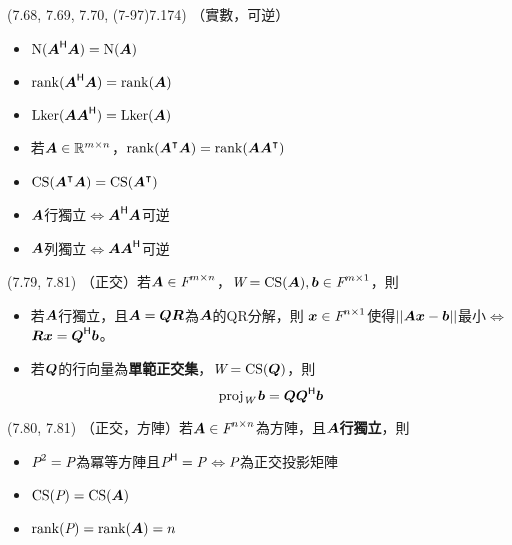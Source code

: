 \item \begin{theorem}{(7.68, 7.69, 7.70, (7-97)7.174)} （實數，可逆）
	\begin{itemize}
		\item $\Ker(\mat{A}\herm \mat{A}) = \Ker(\mat{A})$
		\item $\rnk(\mat{A}\herm \mat{A}) = \rnk(\mat{A})$
		\item $\lker(\mat{A} \mat{A}\herm) = \lker(\mat{A})$
		\item 若$\mat{A} \in \R^{m \times n}$，$\rnk(\mat{A}^\intercal \mat{A}) = \rnk(\mat{A}\mat{A}^\intercal)$
		\item $\cs(\mat{A}^\intercal\mat{A}) = \cs(\mat{A}^\intercal)$
		\item $\mat{A}$行獨立$\iff$$\mat{A}\herm\mat{A}$可逆
		\item $\mat{A}$列獨立$\iff$$\mat{A}\mat{A}\herm$可逆
	\end{itemize}
\end{theorem}

\item \begin{theorem}{(7.79, 7.81)} （正交）若$\mat{A} \in \F^{m \times n}$，$\spc{W} = \cs(\mat{A}), \vec{b} \in \F^{m \times 1}$，則
	\begin{itemize}
		\item 若$\mat{A}$行獨立，且$\mat{A} = \mat{QR}$為$\mat{A}$的QR分解，則
		$\vec{x} \in \F^{n \times 1}$使得$||\mat{A}\vec{x} - \vec{b}||$最小$\iff$$\mat{R}\vec{x} = \mat{Q}\herm \vec{b}$。
		\item 若$\mat{Q}$的行向量為\textbf{單範正交集}，$\spc{W} = \cs(\mat{Q})$，則
		\begin{equation}
			\proj{\spc{W}}{b} = \mat{Q}\mat{Q}\herm\vec{b}
		\end{equation}
	\end{itemize}
\end{theorem}

\item \begin{theorem}{(7.80, 7.81)} （正交，方陣）若$\mat{A} \in \F^{n \times n}$為方陣，且$\mat{A}$\textbf{行獨立}，則
	\begin{itemize}
		\item $\P^2 = \P$為冪等方陣且$\P\herm = \P$$\iff$$\P$為正交投影矩陣
		\item $\cs(\P) = \cs(\mat{A})$
		\item $\rnk(\P) = \rnk(\mat{A}) = n$
	\end{itemize}
\end{theorem}

